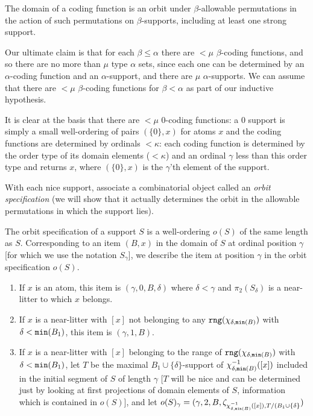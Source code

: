 \documentclass[12pt]{article}
\begin{document}
The domain of a coding function is an orbit under $\beta$-allowable permutations in the action of such permutations on $\beta$-supports, including at least one strong support.

Our ultimate claim is that for each $\beta\leq \alpha$ there are $<\mu$ $\beta$-coding functions, and so there are no more
than $\mu$ type $\alpha$ sets, since each one can be determined by an $\alpha$-coding function and an $\alpha$-support, and there are $\mu$ $\alpha$-supports.  We can assume that there are $<\mu$ $\beta$-coding functions for $\beta<\alpha$ as part of our inductive hypothesis.

It is clear at the basis that there are $<\mu$ 0-coding functions:  a 0 support is simply a small well-ordering of pairs $(\{0\},x)$ for atoms $x$ and the coding functions are determined by ordinals $<\kappa$:  each coding function is determined by the order type of its domain elements ($<\kappa$) and an ordinal $\gamma$
less than this order type and returns $x$, where $(\{0\},x)$ is the $\gamma$'th element of the support.

With each nice support, associate a combinatorial object called an {\em orbit specification\/} (we will show that it actually determines the orbit in the allowable permutations in which the support lies).

The orbit specification of a support $S$ is a well-ordering $o(S)$ of the same length as $S$.  Corresponding to
an item $(B,x)$ in the domain of $S$ at ordinal position $\gamma$ [for which we use the notation $S_\gamma$], we describe the item at position $\gamma$
in the orbit specification $o(S)$.

\begin{enumerate}

\item  If $x$ is an atom, this item is $(\gamma,0,B,\delta)$ where $\delta<\gamma$ and $\pi_2(S_\delta)$ is a near-litter
to which $x$ belongs.

\item  If $x$ is a near-litter with $[x]$ not belonging to any ${\tt rng}(\chi_{\delta,{\tt min}(B)})$ with
$\delta<{\tt min}(B_1)$, this item is $(\gamma,1,B)$.

\item If $x$ is a near-litter with $[x]$ belonging to the range of ${\tt rng}(\chi_{\delta,{\tt min}(B)})$ with
$\delta<{\tt min}(B_1)$, let $T$ be the maximal $B_1\cup \{\delta\}$-support of $\chi_{\delta,{\tt min}(B)}^{-1}([x])$ included 
in the initial segment of $S$ of length $\gamma$ [$T$ will be nice and can be determined just by looking at first projections of domain elements of $S$, information which is contained in $o(S)$], and let $o(S)_\gamma = (\gamma,2,B,\zeta_{\chi_{\delta,{\tt min}(B)}^{-1}([x]),T/(B_1\cup \{\delta\}})$

\end{enumerate}
\end{document}
